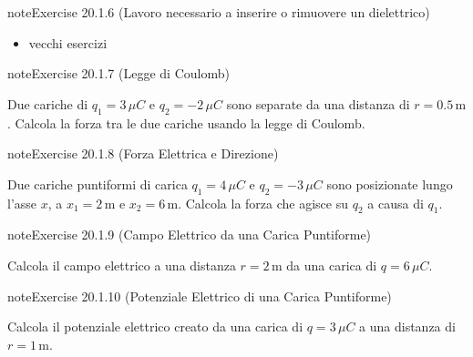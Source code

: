 \documentclass[letterpaper,10pt,italian]{jupyterBook}
\begin{document}
\begin{sphinxadmonition}{note}{Exercise 20.1.6 (Lavoro necessario a inserire o rimuovere un dielettrico)}


\end{sphinxadmonition}
\begin{itemize}
\item {} 
\sphinxAtStartPar
vecchi esercizi

\end{itemize}
 \label{exercise:ch/electromagnetism/electrostatics-problems-exercise-6}

\begin{sphinxadmonition}{note}{Exercise 20.1.7 (Legge di Coulomb)}



\sphinxAtStartPar
Due cariche di \(q_1 = 3 \, \mu C\) e \(q_2 = -2 \, \mu C\) sono separate da una distanza di \(r = 0.5 \, \text{m}\). Calcola la forza tra le due cariche usando la legge di Coulomb.
\end{sphinxadmonition}
 \label{exercise:ch/electromagnetism/electrostatics-problems-exercise-7}

\begin{sphinxadmonition}{note}{Exercise 20.1.8 (Forza Elettrica e Direzione)}



\sphinxAtStartPar
Due cariche puntiformi di carica \(q_1 = 4 \, \mu C\) e \(q_2 = -3 \, \mu C\) sono posizionate lungo l’asse \(x\), a \(x_1 = 2 \, \text{m}\) e \(x_2 = 6 \, \text{m}\). Calcola la forza che agisce su \(q_2\) a causa di \(q_1\).
\end{sphinxadmonition}
 \label{exercise:ch/electromagnetism/electrostatics-problems-exercise-8}

\begin{sphinxadmonition}{note}{Exercise 20.1.9 (Campo Elettrico da una Carica Puntiforme)}



\sphinxAtStartPar
Calcola il campo elettrico a una distanza \(r = 2 \, \text{m}\) da una carica di \(q = 6 \, \mu C\).
\end{sphinxadmonition}
 \label{exercise:ch/electromagnetism/electrostatics-problems-exercise-9}

\begin{sphinxadmonition}{note}{Exercise 20.1.10 (Potenziale Elettrico di una Carica Puntiforme)}



\sphinxAtStartPar
Calcola il potenziale elettrico creato da una carica di \(q = 3 \, \mu C\) a una distanza di \(r = 1 \, \text{m}\).
\end{sphinxadmonition}
 \label{exercise:ch/electromagnetism/electrostatics-problems-exercise-10}
\end{document}

